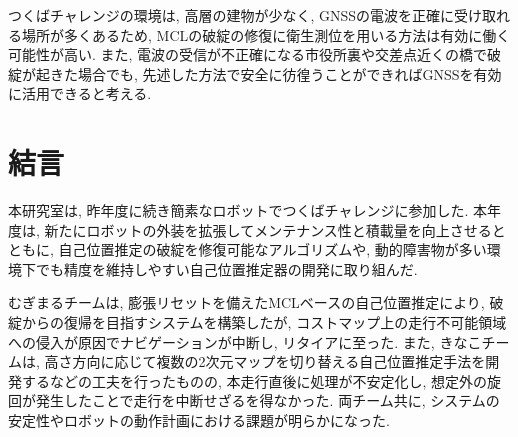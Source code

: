 \documentclass[twocolumn,9pt]{jsproceedings}
\begin{document}
つくばチャレンジの環境は, 高層の建物が少なく, 
GNSSの電波を正確に受け取れる場所が多くあるため, 
MCLの破綻の修復に衛生測位を用いる方法は有効に働く可能性が高い. 
また, 電波の受信が不正確になる市役所裏や交差点近くの橋で破綻が起きた場合でも, 
先述した方法で安全に彷徨うことができればGNSSを有効に活用できると考える. 








\section{結言}
本研究室は, 昨年度に続き簡素なロボットでつくばチャレンジに参加した. 
本年度は, 新たにロボットの外装を拡張してメンテナンス性と積載量を向上させるとともに, 
自己位置推定の破綻を修復可能なアルゴリズムや, 
動的障害物が多い環境下でも精度を維持しやすい自己位置推定器の開発に取り組んだ. 

むぎまるチームは, 
膨張リセットを備えたMCLベースの自己位置推定により, 
破綻からの復帰を目指すシステムを構築したが,  
コストマップ上の走行不可能領域への侵入が原因でナビゲーションが中断し, 
リタイアに至った. 
また, きなこチームは, 
高さ方向に応じて複数の2次元マップを切り替える自己位置推定手法を開発するなどの工夫を行ったものの, 
本走行直後に処理が不安定化し, 
想定外の旋回が発生したことで走行を中断せざるを得なかった. 
両チーム共に, システムの安定性やロボットの動作計画における課題が明らかになった.
\end{document}
